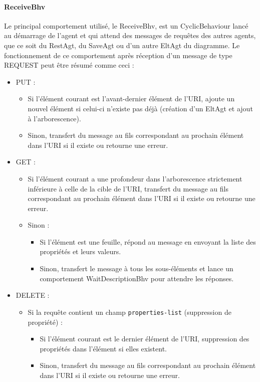 \paragraph{ReceiveBhv}
Le principal comportement utilisé, le ReceiveBhv, est un CyclicBehaviour lancé au démarrage de l'agent et qui attend des messages de requêtes des autres agents, que ce soit du RestAgt, du SaveAgt ou d'un autre EltAgt du diagramme.
Le fonctionnement de ce comportement après réception d'un message de type REQUEST peut être résumé comme ceci :
\begin{itemize}
	\item PUT :
	\begin{itemize}
		\item Si l'élément courant est l'avant-dernier élément de l'URI, ajoute un nouvel élément si celui-ci n'existe pas déjà (création d'un EltAgt et ajout à l'arborescence).
		\item Sinon, transfert du message au fils correspondant au prochain élément dans l'URI si il existe ou retourne une erreur.
	\end{itemize}
  \item GET :
	\begin{itemize}
		\item Si l'élément courant a une profondeur dans l'arborescence strictement inférieure à celle de la cible de l'URI, transfert du message au fils correspondant au prochain élément dans l'URI si il existe ou retourne une erreur.
		\item Sinon :
		\begin{itemize}
			\item Si l'élément est une feuille, répond au message en envoyant la liste des propriétés et leurs valeurs.
			\item Sinon, transfert le message à tous les sous-éléments et lance un comportement WaitDescriptionBhv pour attendre les réponses.
		\end{itemize}
	\end{itemize}
	\newpage
	\item DELETE :
	\begin{itemize}
		\item Si la requête contient un champ \lstinline$properties-list$ (suppression de propriété) :
		\begin{itemize}
			\item Si l'élément courant est le dernier élément de l'URI, suppression des propriétés dans l'élément si elles existent.
			\item Sinon, transfert du message au fils correspondant au prochain élément dans l'URI si il existe ou retourne une erreur.

\end{itemize}
\end{itemize}
\end{itemize}
